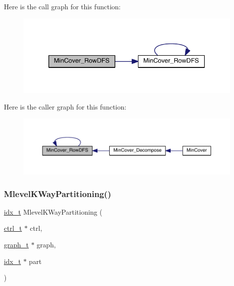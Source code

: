 Here is the call graph for this function\+:\nopagebreak
\begin{figure}[H]
\begin{center}
\leavevmode
\includegraphics[width=328pt]{a00945_a0c77f3519b6c0379ff1129d2db5af605_cgraph}
\end{center}
\end{figure}
Here is the caller graph for this function\+:\nopagebreak
\begin{figure}[H]
\begin{center}
\leavevmode
\includegraphics[width=350pt]{a00945_a0c77f3519b6c0379ff1129d2db5af605_icgraph}
\end{center}
\end{figure}
\mbox{\label{a00945_a7973c78504ad6711d3516082b1112805}} 
\subsubsection{\texorpdfstring{Mlevel\+K\+Way\+Partitioning()}{MlevelKWayPartitioning()}}
{\footnotesize\ttfamily \hyperlink{a00876_aaa5262be3e700770163401acb0150f52}{idx\+\_\+t} Mlevel\+K\+Way\+Partitioning (\begin{DoxyParamCaption}\item[{\hyperlink{a00742}{ctrl\+\_\+t} $\ast$}]{ctrl,  }\item[{\hyperlink{a00734}{graph\+\_\+t} $\ast$}]{graph,  }\item[{\hyperlink{a00876_aaa5262be3e700770163401acb0150f52}{idx\+\_\+t} $\ast$}]{part }\end{DoxyParamCaption})}

